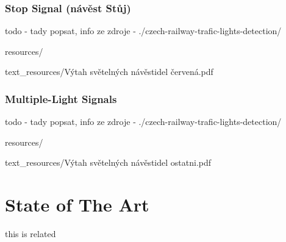 \documentclass[english, ing, kiv, he, iso690alph, pdf, viewonly]{fasthesis}
\begin{document}
%
%
%
\newpage

\subsection{Stop Signal (návěst Stůj)}\label{subsec:stop-signal-(navest-stuj)}

todo - tady popsat, info ze zdroje - ./czech-railway-trafic-lights-detection/

resources/

text\_resources/Výtah světelných návěstidel červená.pdf 




\newpage
\subsection{Multiple-Light Signals}
todo - tady popsat, info ze zdroje - ./czech-railway-trafic-lights-detection/

resources/

text\_resources/Výtah světelných návěstidel ostatni.pdf 



\newpage


\chapter{State of The Art}
this is related\cite{Staino2022}
\end{document}
